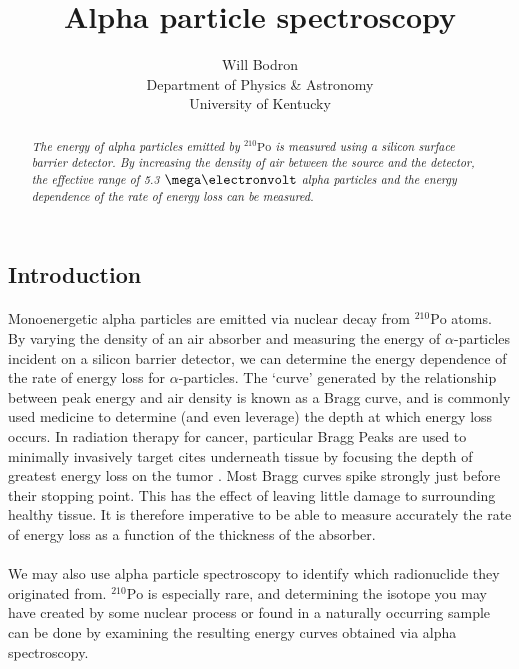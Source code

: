 \documentclass[12pt]{article}
\title{Alpha particle spectroscopy}
\author{Will Bodron \\ Department of Physics \& Astronomy \\ University of Kentucky}
\newcommand{\po}{{}^{210}\text{Po}}
\begin{document}
\maketitle

\begin{abstract}
    \textit{The energy of alpha particles emitted by $\po$ is measured using a silicon surface barrier detector. By increasing the density of air between the source and the detector, the effective range of 5.3 $\mega \electronvolt$ alpha particles and the energy dependence of the rate of energy loss can be measured.}
\end{abstract}

\begin{multicols}{2}

    \section{Introduction}
    \paragraph{} Monoenergetic alpha particles are emitted via nuclear decay from $\po$ atoms. By varying the density of an air absorber and measuring the energy of $\alpha$-particles incident on a silicon barrier detector, we can determine the energy dependence of the rate of energy loss for $\alpha$-particles. \cite{kovash} The `curve' generated by the relationship between peak energy and air density is known as a Bragg curve, and is commonly used medicine to determine (and even leverage) the depth at which energy loss occurs. In radiation therapy for cancer, particular Bragg Peaks are used to minimally invasively target cites underneath tissue by focusing the depth of greatest energy loss on the tumor \cite{brookhaven}. Most Bragg curves spike strongly just before their stopping point. This has the effect of leaving little damage to surrounding healthy tissue. It is therefore imperative to be able to measure accurately the rate of energy loss as a function of the thickness of the absorber.
    \paragraph{} We may also use alpha particle spectroscopy to identify which radionuclide they originated from. $\po$ is especially rare, and determining the isotope you may have created by some nuclear process or found in a naturally occurring sample can be done by examining the resulting energy curves obtained via alpha spectroscopy.


\end{multicols}
\end{document}
